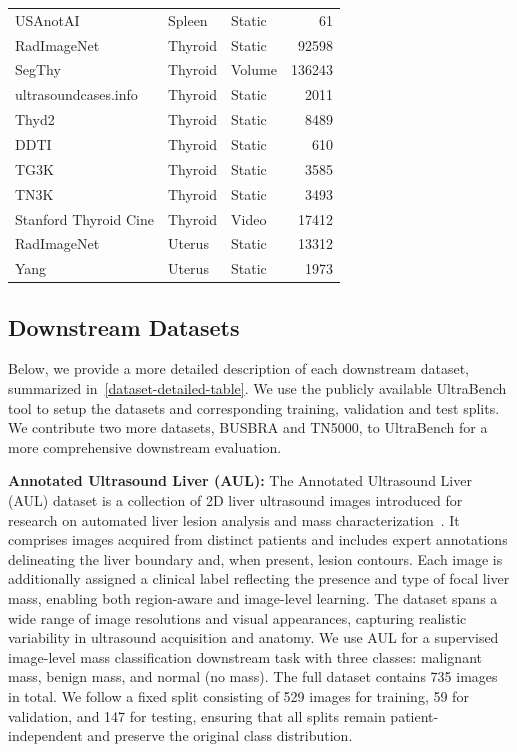 \documentclass{article}
\theoremstyle{plain}
\theoremstyle{definition}
\theoremstyle{remark}
\begin{document}
\begin{small}
\begin{center}
\begin{sc}
\begin{longtable}{lllr}
USAnotAI & Spleen & Static & 61 \\
RadImageNet & Thyroid & Static & 92598 \\
SegThy \cite{kronke_tracked_2022} & Thyroid & Volume & 136243 \\
ultrasoundcases.info & Thyroid & Static & 2011 \\
Thyd2 \cite{hou_ultrasonography_2024} & Thyroid & Static & 8489 \\
DDTI \cite{pedraza_open_2015} & Thyroid & Static & 610 \\
TG3K \cite{gong_haifangongtrfe-net-for-thyroid-nodule-segmentation_2026} & Thyroid & Static & 3585 \\
TN3K \cite{gong_haifangongtrfe-net-for-thyroid-nodule-segmentation_2026} & Thyroid & Static & 3493 \\
Stanford Thyroid Cine \cite{yamashita_toward_2022} & Thyroid & Video & 17412 \\
RadImageNet & Uterus & Static & 13312 \\
Yang \cite{tiantian_yang_uterine_2023} & Uterus & Static & 1973 \\
\end{longtable}
\end{sc}
\end{center}
\end{small}

\subsection{Downstream Datasets}\label{app:B.2}

Below, we provide a more detailed description of each downstream dataset, summarized in~\cref{dataset-detailed-table}. We use the publicly available UltraBench tool to setup the datasets and corresponding training, validation and test splits. We contribute two more datasets, BUSBRA and TN5000, to UltraBench for a more comprehensive downstream evaluation.

\textbf{Annotated Ultrasound Liver (AUL):} The Annotated Ultrasound Liver (AUL) dataset is a collection of 2D liver ultrasound images introduced for research on automated liver lesion analysis and mass characterization~\cite{Xu2023ImprovingFrames}. It comprises images acquired from distinct patients and includes expert annotations delineating the liver boundary and, when present, lesion contours. Each image is additionally assigned a clinical label reflecting the presence and type of focal liver mass, enabling both region-aware and image-level learning. The dataset spans a wide range of image resolutions and visual appearances, capturing realistic variability in ultrasound acquisition and anatomy. We use AUL for a supervised image-level mass classification downstream task with three classes: malignant mass, benign mass, and normal (no mass). The full dataset contains 735 images in total. We follow a fixed split consisting of 529 images for training, 59 for validation, and 147 for testing, ensuring that all splits remain patient-independent and preserve the original class distribution.
\end{document}
